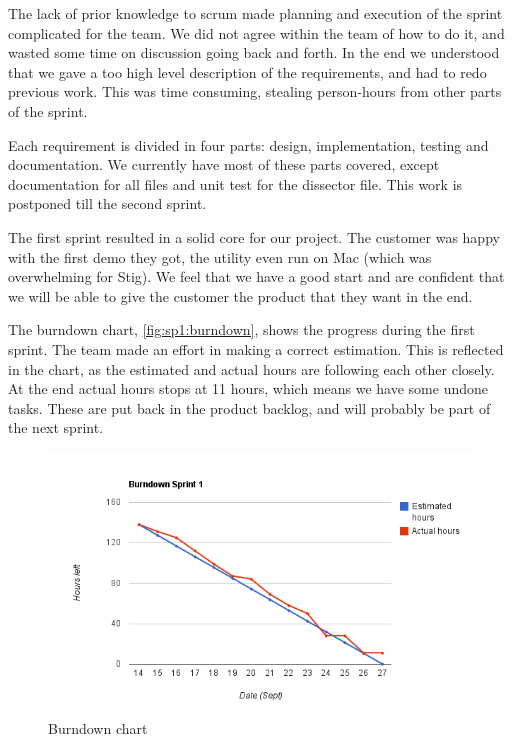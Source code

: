 The lack of prior knowledge to scrum made planning and execution of the sprint
complicated for the team. We did not agree within the team of how to do it, and
wasted some time on discussion going back and forth. In the end we understood
that we gave a too high level description of the requirements, and had to redo
previous work. This was time consuming, stealing person-hours from other parts
of the sprint.

Each requirement is divided in four parts: design, implementation, testing and
documentation. We currently have most of these parts covered, except
documentation for all files and unit test for the dissector file. This work is
postponed till the second sprint.

The first sprint resulted in a solid core for our project. The customer was
happy with the first demo they got, the utility even run on Mac (which was
overwhelming for Stig). We feel that we have a good start and are confident
that we will be able to give the customer the product that they want in the
end.

The burndown chart, \autoref{fig:sp1:burndown}, shows the progress during
the first sprint. The team made an effort in making a correct estimation. This
is reflected in the chart, as the estimated and actual hours are  following
each other closely. At the end actual hours stops at 11 hours, which means we
have some undone tasks. These are put back in the product backlog, and will
probably be part of the next sprint. 

\begin{figure}[!htb]
	\includegraphics[width=\textwidth]{./sprints/img/burndown_chart_s1}
	\caption{Burndown chart\label{fig:sp1:burndown}}
\end{figure}

